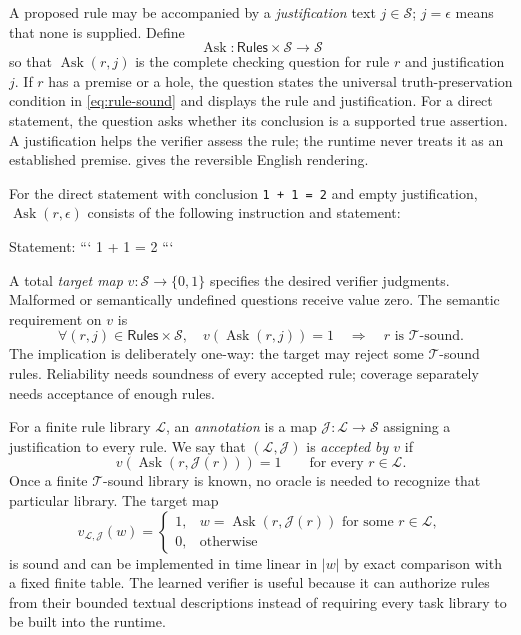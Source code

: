 \documentclass[11pt,twoside]{article}
\theoremstyle{definition}
\newcommand{\Stext}{\mathcal S}
\newcommand{\True}{\mathcal T}
\newcommand{\Lib}{\mathcal L}
\newcommand{\Annot}{\mathcal J}
\newcommand{\Rules}{\mathsf{Rules}}
\newcommand{\Ask}{\operatorname{Ask}}
\begin{document}
A proposed rule may be accompanied by a \emph{justification} text
$j\in\Stext$; $j=\epsilon$ means that none is supplied. Define
\[
 \Ask:\Rules\times\Stext\longrightarrow\Stext
\]
so that $\Ask(r,j)$ is the complete checking question for rule $r$ and
justification $j$. If $r$ has a premise or a hole, the question states the
universal truth-preservation condition in \cref{eq:rule-sound} and displays
the rule and justification. For a direct statement, the question asks whether
its conclusion is a supported true assertion. A justification helps the
verifier assess the rule; the runtime never treats it as an established
premise.  gives the reversible English rendering.

For the direct statement with conclusion \texttt{1 + 1 = 2} and empty
justification, $\Ask(r,\epsilon)$ consists of the following instruction and
statement:
\begin{quote}

\end{quote}
\begin{code}
Statement:
```
1 + 1 = 2
```
\end{code}

A total \emph{target map} $v:\Stext\to\{0,1\}$ specifies the desired verifier
judgments. Malformed or semantically undefined questions receive value zero.
The semantic requirement on $v$ is
\begin{equation}
 \forall(r,j)\in\Rules\times\Stext,\quad
 v(\Ask(r,j))=1\quad\Longrightarrow\quad r\text{ is $\True$-sound}.
\label{eq:v-sound}
\end{equation}
The implication is deliberately one-way: the target may reject some
$\True$-sound rules. Reliability needs soundness of every accepted rule;
coverage separately needs acceptance of enough rules.

For a finite rule library $\Lib$, an \emph{annotation} is a map
$\Annot:\Lib\to\Stext$ assigning a justification to every rule. We say that
$(\Lib,\Annot)$ is \emph{accepted by $v$} if
\begin{equation}
 v(\Ask(r,\Annot(r)))=1
 \qquad\text{for every }r\in\Lib.
\label{eq:accepted-library}
\end{equation}
Once a finite $\True$-sound library is known, no oracle is needed to recognize
that particular library. The target map
\begin{equation}
 v_{\Lib,\Annot}(w)=
 \begin{cases}
 1,&w=\Ask(r,\Annot(r))\text{ for some }r\in\Lib,\\
 0,&\text{otherwise}
 \end{cases}
\label{eq:library-target}
\end{equation}
is sound and can be implemented in time linear in $|w|$ by exact comparison
with a fixed finite table. The
learned verifier is useful because it can authorize rules from their bounded
textual descriptions instead of requiring every task library to be built into
the runtime.
\end{document}
